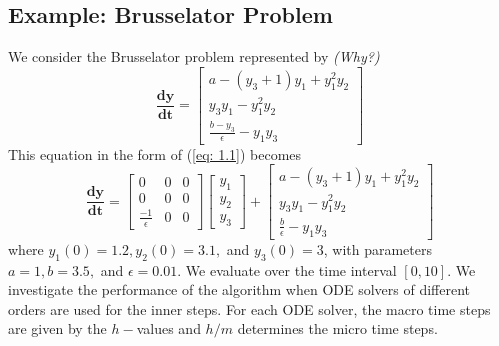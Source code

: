 \documentclass[12pt]{article}
\begin{document}
\subsection{Example: Brusselator Problem}
We consider the Brusselator problem represented by  \emph{(Why?)}
\begin{equation}
\mathbf{\frac{dy}{dt}} = \begin{bmatrix}
a - (y_3 + 1)y_1 + y_1^2y_2\\ y_3y_1 - y_1^2y_2\\ \frac{b-y_3}{\epsilon} - y_1y_3
\end{bmatrix}
\end{equation}
This equation in the form of (\ref{eq: 1.1}) becomes
\begin{equation}
\mathbf{\frac{dy}{dt}} = \begin{bmatrix}
0 & 0 & 0 \\ 0 & 0 & 0 \\ \frac{-1}{\epsilon} & 0 & 0
\end{bmatrix} \begin{bmatrix}
y_1 \\ y_2 \\ y_3
\end{bmatrix}  + \begin{bmatrix}
a - (y_3 + 1)y_1 + y_1^2y_2\\ y_3y_1 - y_1^2y_2\\ \frac{b}{\epsilon} - y_1y_3
\end{bmatrix}
\end{equation}
where $y_1(0) = 1.2, y_2(0) = 3.1,$ and $y_3(0) = 3$, with parameters $a=1, b=3.5,$ and $\epsilon =0.01$.  We evaluate over the time interval $[0,10]$. We investigate the performance of the algorithm when ODE solvers of different orders are used for the inner steps. For each ODE solver, the macro time steps are given by the $h-$values and $h/m$ determines the micro time steps.\\

\end{document}
